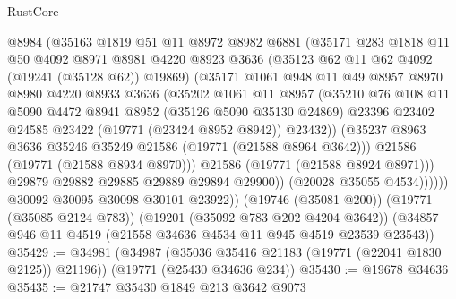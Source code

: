 \begin{lexlean}{RustCore}
\begin{coremodule}
                    @8984
                    (@35163
                      @1819
                      @51
                      @11
                      @8972
                      @8982
                      @6881
                      (@35171
                        @283
                        @1818
                        @11
                        @50
                        @4092
                        @8971
                        @8981
                        @4220
                        @8923
                        @3636
                        (@35123 @62 @11 @62 @4092 (@19241 (@35128 @62)) @19869)
                        (@35171
                          @1061
                          @948
                          @11
                          @49
                          @8957
                          @8970
                          @8980
                          @4220
                          @8933
                          @3636
                          (@35202
                            @1061
                            @11
                            @8957
                            (@35210
                              @76
                              @108
                              @11
                              @5090
                              @4472
                              @8941
                              @8952
                              (@35126 @5090 @35130 @24869)
                              @23396
                              @23402
                              @24585
                              @23422
                              (@19771 (@23424 @8952 @8942))
                              @23432))
                          (@35237 @8963 @3636 @35246 @35249 @21586 (@19771 (@21588 @8964 @3642)))
                          @21586
                          (@19771 (@21588 @8934 @8970)))
                        @21586
                        (@19771 (@21588 @8924 @8971)))
                      @29879
                      @29882
                      @29885
                      @29889
                      @29894
                      @29900))
                  (@20028 @35055 @4534))))))
        @30092
        @30095
        @30098
        @30101
        @23922))
    (@19746 (@35081 @200))
    (@19771 (@35085 @2124 @783))
    (@19201 (@35092 @783 @202 @4204 @3642))
    (@34857 @946 @11 @4519 (@21558 @34636 @4534 @11 @945 @4519 @23539 @23543))
@35429 := @34981
    (@34987 (@35036 @35416 @21183 (@19771 (@22041 @1830 @2125)) @21196))
    (@19771 (@25430 @34636 @234))
@35430 := @19678 @34636
@35435 := @21747 @35430 @1849 @213 @3642 @9073

\end{coremodule}
\end{lexlean}
